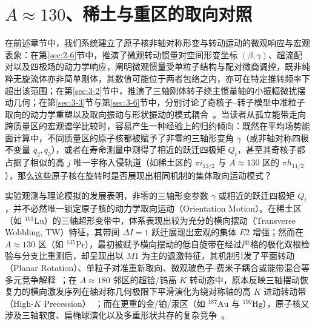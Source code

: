 \section{$A\approx 130$、稀土与重区的取向对照}\label{sec:4-4}

在前述章节中，我们系统建立了原子核非轴对称形变与转动运动的微观响应与宏观表象：在第\ref{sec:2-6}节中，推演了微观转动惯量对空间形变坐标 $(\beta, \gamma)$、超流配对以及四极场的动力学响应，阐明微观惯量受单粒子结构与配对微商调控，既非纯粹无旋流体亦非简单刚体，其数值可能位于两者包络之内，亦可在特定推转频率下超出该范围；在第\ref{sec:3-2}节中，推演了三轴刚体转子绕主惯量轴的小振幅微扰摆动几何；在第\ref{sec:3-3}节与第\ref{sec:3-6}节中，分别讨论了奇核子--转子模型中准粒子取向的动力学重塑以及取向振动与形状振动的模式耦合~\cite{book-bohr-mottelson-nuclear-structure-vol2,frauendorf-2001-spontaneous-symmetry-breaking-rotating-nuclei}。当读者从孤立能带走向跨质量区的宏观谱学比较时，容易产生一种经验上的归约倾向：既然在平均场势能面计算中，不同质量区的原子核都被赋予了非零的三轴形变角 $\gamma$（或非轴对称四极不变量 $q_2, q_3$），或者在寿命测量中测得了相近的跃迁四极矩 $Q_t$，甚至其奇核子都占据了相似的高 $j$ 唯一宇称入侵轨道（如稀土区的 $\pi i_{13/2}$ 与 $A\approx 130$ 区的 $\pi h_{11/2}$），那么这些原子核在旋转时是否展现出相同机制的集体取向运动模式？

实验观测与理论模拟的发展表明，非零的三轴形变参数 $\gamma$ 或相近的跃迁四极矩 $Q_t$，并不必然唯一锁定原子核的动力学取向运动（Orientation Motion）。在稀土区（如 $^{163}\mathrm{Lu}$）的三轴超形变带中，体系表现出较为充分的横向摆动（Transverse Wobbling, TW）特征，其带间 $\Delta I = 1$ 跃迁展现出宏观的集体 $E2$ 增强；然而在 $A\approx 130$ 区（如 $^{135}\mathrm{Pr}$），最初被赋予横向摆动的低自旋带在经过严格的极化双根检验与分支比重测后，却呈现出以 $M1$ 为主的退激特征，其机制引发了平面转动（Planar Rotation）、单粒子对准重新取向、微观玻色子-费米子耦合或能带混合等多元竞争解释~\cite{lv-2022-evidence-against-wobbling-135pr,nomura-2022-questioning-wobbling-ibfm}；在 $A\approx 180$ 邻区的超铪/钨高 $K$ 转动态中，原本反映三轴摆动恢复力的横向激发序列在轴对称几何极限下平滑演化为绕对称轴的高 $K$ 进动转动带（High-$K$ Precession）~\cite{shimizu-2005-high-k-precession}；而在更重的金/铂/汞区（如 $^{187}\mathrm{Au}$ 与 $^{190}\mathrm{Hg}$），原子核又涉及三轴软度、扁椭球演化以及多重形状共存的复杂竞争~\cite{guo-2022-low-spin-wobbling-187au}。


